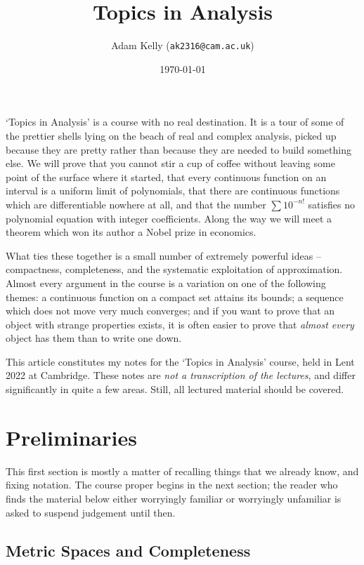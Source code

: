 \documentclass[a4paper]{scrartcl}
\title{Topics in Analysis}
\author{Adam Kelly (\texttt{ak2316@cam.ac.uk})}
\date{\today}
\begin{document}
\maketitle

`Topics in Analysis' is a course with no real destination. It is a tour of some of the prettier shells lying on the beach of real and complex analysis, picked up because they are pretty rather than because they are needed to build something else. We will prove that you cannot stir a cup of coffee without leaving some point of the surface where it started, that every continuous function on an interval is a uniform limit of polynomials, that there are continuous functions which are differentiable nowhere at all, and that the number $\sum 10^{-n!}$ satisfies no polynomial equation with integer coefficients. Along the way we will meet a theorem which won its author a Nobel prize in economics.

What ties these together is a small number of extremely powerful ideas -- compactness, completeness, and the systematic exploitation of approximation. Almost every argument in the course is a variation on one of the following themes: a continuous function on a compact set attains its bounds; a sequence which does not move very much converges; and if you want to prove that an object with strange properties exists, it is often easier to prove that \emph{almost every} object has them than to write one down.

This article constitutes my notes for the `Topics in Analysis' course, held in Lent 2022 at Cambridge. These notes are \emph{not a transcription of the lectures}, and differ significantly in quite a few areas. Still, all lectured material should be covered.

\tableofcontents

\section{Preliminaries}

This first section is mostly a matter of recalling things that we already know, and fixing notation. The course proper begins in the next section; the reader who finds the material below either worryingly familiar or worryingly unfamiliar is asked to suspend judgement until then.

\subsection{Metric Spaces and Completeness}
\end{document}
